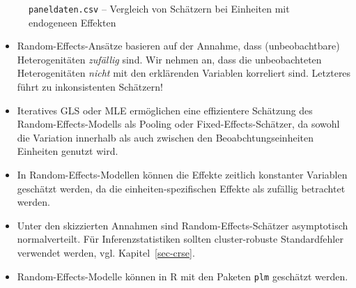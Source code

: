 \documentclass[
  a4paper,
  DIV=11,
  oneside]{scrreprt}
\begin{document}
\begin{figure}[t]


\caption{\label{fig-panelcomparison}\texttt{paneldaten.csv} -- Vergleich
von Schätzern bei Einheiten mit endogeneen Effekten}

\end{figure}%

\begin{tcolorbox}[enhanced jigsaw, breakable, colbacktitle=quarto-callout-note-color!10!white, rightrule=.15mm, title=\textcolor{quarto-callout-note-color}{\faInfo}\hspace{0.5em}{Key Facts zu Random-Effects-Regression}, opacityback=0, coltitle=black, colback=white, arc=.35mm, titlerule=0mm, bottomtitle=1mm, leftrule=.75mm, toptitle=1mm, bottomrule=.15mm, left=2mm, toprule=.15mm, opacitybacktitle=0.6, colframe=quarto-callout-note-color-frame]

\begin{itemize}
\item
  Random-Effects-Ansätze basieren auf der Annahme, dass (unbeobachtbare)
  Heterogenitäten \emph{zufällig} sind. Wir nehmen an, dass die
  unbeobachteten Heterogenitäten \emph{nicht} mit den erklärenden
  Variablen korreliert sind. Letzteres führt zu inkonsistenten
  Schätzern!
\item
  Iteratives GLS oder MLE ermöglichen eine effizientere Schätzung des
  Random-Effects-Modells als Pooling oder Fixed-Effects-Schätzer, da
  sowohl die Variation innerhalb als auch zwischen den
  Beoabchtungseinheiten Einheiten genutzt wird.
\item
  In Random-Effects-Modellen können die Effekte zeitlich konstanter
  Variablen geschätzt werden, da die einheiten-spezifischen Effekte als
  zufällig betrachtet werden.
\item
  Unter den skizzierten Annahmen sind Random-Effects-Schätzer
  asymptotisch normalverteilt. Für Inferenzstatistiken sollten
  cluster-robuste Standardfehler verwendet werden, vgl.
  Kapitel~\ref{sec-crse}.
\item
  Random-Effects-Modelle können in R mit den Paketen \texttt{plm}
  geschätzt werden.
\end{itemize}

\end{tcolorbox}
\end{document}
